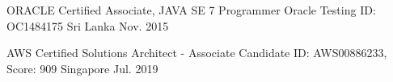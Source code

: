 

\begin{cvhonors}

  \cvhonor
    {ORACLE Certified Associate, JAVA SE 7 Programmer} %
    {Oracle Testing ID: OC1484175} %
    {Sri Lanka} %
    {Nov. 2015} %

  \cvhonor
    {AWS Certified Solutions Architect - Associate} %
    {Candidate ID: AWS00886233, Score: 909} %
    {Singapore} %
    {Jul. 2019} %

\end{cvhonors}
